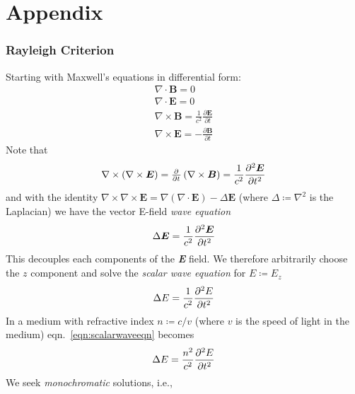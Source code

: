 %
%
%
%
%
%
%
%
%

\section{Appendix}\label{sec:appendix}
\localtableofcontents

\subsubsection{Rayleigh Criterion}

\newcommand*{\E}{\bm{E}}
\newcommand*{\B}{\bm{B}}

Starting with Maxwell's equations in differential form:
\begin{align}
    \nabla \cdot \B = 0 \\
    \nabla \cdot \E = 0 \\
    \nabla \times \B = \frac{1}{c^2} \frac{\partial \E}{\partial t} \\
    \nabla \times \E = - \frac{\partial \B}{\partial t} 
\end{align}
Note that 
\begin{equation}
    \nabla \times \left( \nabla \times \E \right) = \pd{}{t} \left( \nabla \times \B\right) = \frac{1}{c^2} \pdv[2]{\E}{t}
\end{equation}
and with the identity \(\nabla \times \nabla \times \E = \nabla (\nabla\cdot \E) - \Delta \E\) (where \(\Delta \coloneqq \nabla^2\) is the Laplacian) we have the vector E-field \textit{wave equation}
\begin{equation}
    \Delta \E = \frac{1}{c^2} \pdv[2]{\E}{t}
\end{equation}
This decouples each components of the \textit{\textbf{E}} field. We therefore arbitrarily choose the \(z\) component and solve the \textit{scalar wave equation} for \(E \coloneqq E_z\)
\begin{equation}
    \Delta E = \frac{1}{c^2} \pdv[2]{E}{t}\label{eqn:scalarwaveeqn}
\end{equation}
In a medium with refractive index \(n \coloneqq c/v\) (where \(v\) is the speed of light in the medium) eqn.~\eqref{eqn:scalarwaveeqn} becomes
\begin{equation}
    \Delta E = \frac{n^2}{c^2} \pdv[2]{E}{t}\label{eqn:scalarwaveeqnmed}
\end{equation}
We seek \textit{monochromatic} solutions, i.e., 